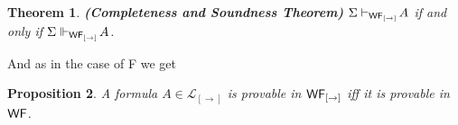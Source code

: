 \documentclass[12pt]{article}
\newtheorem{thm}{Theorem}[section]
\newtheorem{prop}[thm]{Proposition}
\begin{document}
\begin{thm}
\em\textbf{(Completeness and Soundness Theorem)} $ \Sigma\vdash_{{\sf WF_{[\rightarrow ]}} }\!A $ if and only if $ \Sigma\Vdash_{{\sf WF_{[\rightarrow ]}}}\!A $.
\end{thm}


And as in the case of {\sf F} we get

\begin{prop}
A formula $  A \in \mathcal{L}_{[\rightarrow]}  $ is provable in ${\sf WF_{[\rightarrow]}} $ iff it is provable in ${\sf WF}  $.
\end{prop}
\end{document}
